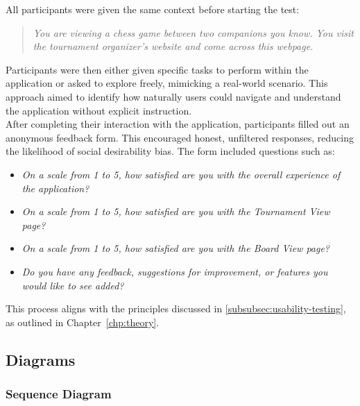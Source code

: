 All participants were given the same context before starting the test: 

\begin{quote}
\textit{You are viewing a chess game between two companions you know. You visit the tournament organizer's website and come across this webpage.}
\end{quote}

Participants were then either given specific tasks to perform within the application or asked to explore freely, mimicking a real-world scenario. This approach aimed to identify how naturally users could navigate and understand the application without explicit instruction. \\

After completing their interaction with the application, participants filled out an anonymous feedback form. This encouraged honest, unfiltered responses, reducing the likelihood of social desirability bias. The form included questions such as:

\begin{itemize}
    \item \textit{On a scale from 1 to 5, how satisfied are you with the overall experience of the application?}
    \item \textit{On a scale from 1 to 5, how satisfied are you with the Tournament View page?}
    \item \textit{On a scale from 1 to 5, how satisfied are you with the Board View page?}
    \item \textit{Do you have any feedback, suggestions for improvement, or features you would like to see added?}
\end{itemize}

This process aligns with the principles discussed in \ref{subsubsec:usability-testing}, as outlined in Chapter~\ref{chp:theory}.


\subsection{Diagrams}
\label{subsec:diagrams}

\subsubsection*{Sequence Diagram}
\label{subsubsec:sequence-diagram}

